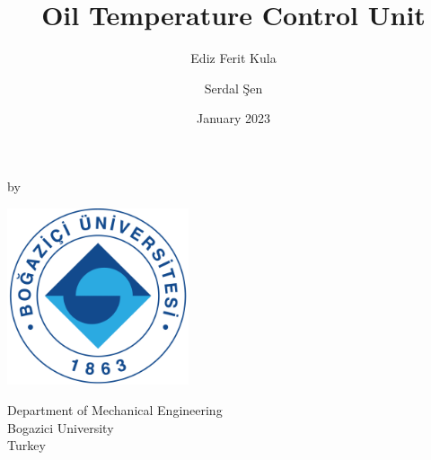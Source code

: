 \documentclass[a4paper]{report} %
\title{Oil Temperature Control Unit}
\author{Ediz Ferit Kula \and Serdal Şen}
\date{January 2023}
\begin{document}

    \begin{titlepage}
        \begin{center}
            \vspace*{1cm}

    
            \LARGE
            \thetitle
            
            \Large
            \vspace{0.5cm}
            
            by
            
            \vspace{0.5cm}
            \theauthor
            
            \vfill
            
            \vspace{0.8cm}
            \includegraphics[width=0.4\textwidth]{images/logo.png}
            
            \Large
            Department of Mechanical Engineering\\
            Bogazici University\\
            Turkey\\
            \thedate
            \vspace*{1cm}
        \end{center}
    \end{titlepage}
\end{document}
